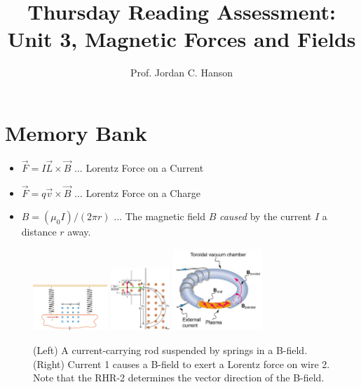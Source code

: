 \documentclass{article}
\begin{document}
\title{Thursday Reading Assessment: Unit 3, Magnetic Forces and Fields}
\author{Prof. Jordan C. Hanson}

\maketitle

\section{Memory Bank}

\begin{itemize}
\item $\vec{F} = I \vec{L} \times \vec{B}$ ... Lorentz Force on a Current
\item $\vec{F} = q \vec{v} \times \vec{B}$ ... Lorentz Force on a Charge
\item $B = (\mu_0 I)/(2\pi r)$ ... The magnetic field $B$ \textit{caused} by the current $I$ a distance $r$ away.
\end{itemize}

\begin{figure}[ht]
\centering
\includegraphics[width=0.25\textwidth]{currentBfieldSpring.jpeg} \hspace{0.2cm}
\includegraphics[width=0.2\textwidth]{figures/mass_spec.jpeg} \hspace{0.2cm}
\includegraphics[width=0.3\textwidth]{figures/tokamak.png}
\caption{\label{fig:para} (Left) A current-carrying rod suspended by springs in a B-field.  (Right) Current 1 causes a B-field to exert a Lorentz force on wire 2.  Note that the RHR-2 determines the vector direction of the B-field.}
\end{figure}
\end{document}
